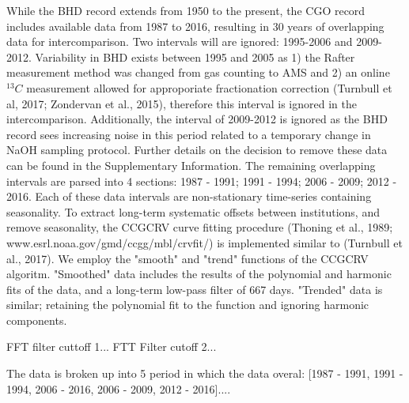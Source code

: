 While the BHD record extends from 1950 to the present, the CGO record includes available data from 1987 to 2016, resulting in 30 years of overlapping data for intercomparison. 
Two intervals will are ignored: 1995-2006 and 2009-2012.
Variability in BHD exists between 1995 and 2005 as 1) the Rafter measurement method was changed from gas counting to AMS and 2) an online $^{13}C$ measurement allowed for approporiate fractionation correction (Turnbull et al, 2017; Zondervan et al., 2015), therefore this interval is ignored in the intercomparison. 
Additionally, the interval of 2009-2012 is ignored as the BHD record sees increasing noise in this period related to a temporary change in NaOH sampling protocol. Further details on the decision to remove these data can be found in the Supplementary Information. 
The remaining overlapping intervals are parsed into 4 sections: 1987 - 1991; 1991 - 1994; 2006 - 2009; 2012 - 2016. 
Each of these data intervals are non-stationary time-series containing seasonality. 
To extract long-term systematic offsets between institutions, and remove seasonality, the CCGCRV curve fitting procedure (Thoning et al., 1989; www.esrl.noaa.gov/gmd/ccgg/mbl/crvfit/) is implemented similar to (Turnbull et al., 2017). We employ the "smooth" and "trend" functions of the CCGCRV algoritm. "Smoothed" data includes the results of the polynomial and harmonic fits of the data, and a long-term low-pass filter of 667 days. "Trended" data is similar; retaining the polynomial fit to the function and ignoring harmonic components. 






FFT filter cuttoff 1...
FTT Filter cutoff 2...

The data is broken up into 5 period in which the data overal: [1987 - 1991, 1991 - 1994, 2006 - 2016, 2006 - 2009, 2012 - 2016]....




























